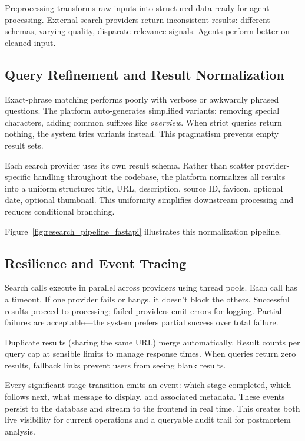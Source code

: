 \documentclass[12pt, a4paper]{article}
\begin{document}
Preprocessing transforms raw inputs into structured data ready for agent processing. External search providers return inconsistent results: different schemas, varying quality, disparate relevance signals. Agents perform better on cleaned input.

\subsection{Query Refinement and Result Normalization}

Exact-phrase matching performs poorly with verbose or awkwardly phrased questions. The platform auto-generates simplified variants: removing special characters, adding common suffixes like \textit{overview}. When strict queries return nothing, the system tries variants instead. This pragmatism prevents empty result sets.

Each search provider uses its own result schema. Rather than scatter provider-specific handling throughout the codebase, the platform normalizes all results into a uniform structure: title, URL, description, source ID, favicon, optional date, optional thumbnail. This uniformity simplifies downstream processing and reduces conditional branching.

Figure~\ref{fig:research_pipeline_fastapi} illustrates this normalization pipeline.

\subsection{Resilience and Event Tracing}

Search calls execute in parallel across providers using thread pools. Each call has a timeout. If one provider fails or hangs, it doesn't block the others. Successful results proceed to processing; failed providers emit errors for logging. Partial failures are acceptable—the system prefers partial success over total failure.

Duplicate results (sharing the same URL) merge automatically. Result counts per query cap at sensible limits to manage response times. When queries return zero results, fallback links prevent users from seeing blank results.

Every significant stage transition emits an event: which stage completed, which follows next, what message to display, and associated metadata. These events persist to the database and stream to the frontend in real time. This creates both live visibility for current operations and a queryable audit trail for postmortem analysis.
\end{document}
